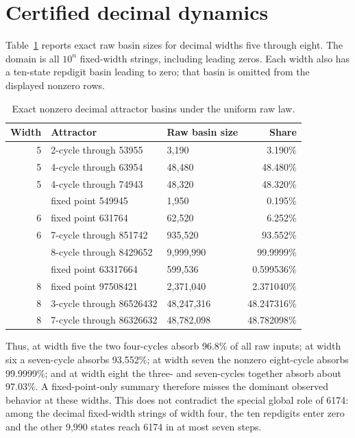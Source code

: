 \documentclass[11pt]{article}
\theoremstyle{definition}
\theoremstyle{remark}
\newcommand{\1}{\mathbf{1}}
\begin{document}
\section{Certified decimal dynamics}

Table~\ref{tab:decimal-basins} reports exact raw basin sizes for decimal widths
five through eight.  The domain is all $10^n$ fixed-width strings, including
leading zeros.  Each width also has a ten-state repdigit basin leading to zero;
that basin is omitted from the displayed nonzero rows.

\begin{table}[ht]
\centering
\caption{Exact nonzero decimal attractor basins under the uniform raw law.}
\label{tab:decimal-basins}
\small
\begin{tabular}{@{}rllr@{}}
\toprule
Width & Attractor & Raw basin size & Share \\
\midrule
5 & 2-cycle through 53955 & 3,190 & 3.190\% \\
5 & 4-cycle through 63954 & 48,480 & 48.480\% \\
5 & 4-cycle through 74943 & 48,320 & 48.320\% \\
\addlinespace
6 & fixed point 549945 & 1,950 & 0.195\% \\
6 & fixed point 631764 & 62,520 & 6.252\% \\
6 & 7-cycle through 851742 & 935,520 & 93.552\% \\
\addlinespace
7 & 8-cycle through 8429652 & 9,999,990 & 99.9999\% \\
\addlinespace
8 & fixed point 63317664 & 599,536 & 0.599536\% \\
8 & fixed point 97508421 & 2,371,040 & 2.371040\% \\
8 & 3-cycle through 86526432 & 48,247,316 & 48.247316\% \\
8 & 7-cycle through 86326632 & 48,782,098 & 48.782098\% \\
\bottomrule
\end{tabular}
\end{table}

Thus, at width five the two four-cycles absorb 96.8\% of all raw inputs; at
width six a seven-cycle absorbs 93.552\%; at width seven the nonzero
eight-cycle absorbs 99.9999\%; and at width eight the three- and seven-cycles
together absorb about 97.03\%.  A fixed-point-only summary therefore misses
the dominant observed behavior at these widths.  This does not contradict the
special global role of 6174: among the decimal fixed-width strings of width
four, the ten repdigits enter zero and the other 9,990 states reach 6174 in at
most seven steps.
\end{document}
